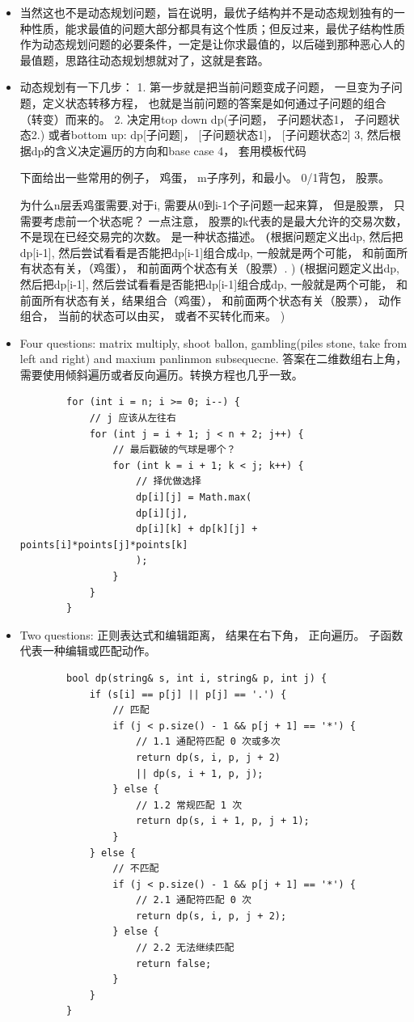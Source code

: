 \documentclass[a4paper,11pt,twoside]{book}
\begin{document}
\begin{itemize}
	
	\item 当然这也不是动态规划问题，旨在说明，最优子结构并不是动态规划独有的一种性质，能求最值的问题大部分都具有这个性质；但反过来，最优子结构性质作为动态规划问题的必要条件，一定是让你求最值的，以后碰到那种恶心人的最值题，思路往动态规划想就对了，这就是套路。
	
	\item 动态规划有一下几步：
	1. 第一步就是把当前问题变成子问题， 一旦变为子问题，定义状态转移方程， 也就是当前问题的答案是如何通过子问题的组合（转变）而来的。  
	2. 决定用top down dp(子问题， 子问题状态1， 子问题状态2.)  或者bottom up: dp[子问题]， [子问题状态1]， [子问题状态2] 
	3, 然后根据dp的含义决定遍历的方向和base case
	4， 套用模板代码
	
	下面给出一些常用的例子， 鸡蛋， m子序列，和最小。 0/1背包， 股票。 
	
	为什么n层丢鸡蛋需要,对于i, 需要从0到i-1个子问题一起来算， 但是股票， 只需要考虑前一个状态呢？ 一点注意， 股票的k代表的是最大允许的交易次数，不是现在已经交易完的次数。 是一种状态描述。 
	\textbf(根据问题定义出dp, 然后把dp[i-1], 然后尝试看看是否能把dp[i-1]组合成dp, 一般就是两个可能， 和前面所有状态有关，（鸡蛋）， 和前面两个状态有关（股票）. ) 
	\textbf(根据问题定义出dp, 然后把dp[i-1], 然后尝试看看是否能把dp[i-1]组合成dp, 一般就是两个可能， 和前面所有状态有关，结果组合（鸡蛋）， 和前面两个状态有关（股票）， 动作组合， 当前的状态可以由买， 或者不买转化而来。  ) 
	
	
	
	\item Four questions: matrix multiply, shoot ballon, gambling(piles stone, take from left and right) and maxium panlinmon subsequecne. 答案在二维数组右上角， 需要使用倾斜遍历或者反向遍历。转换方程也几乎一致。
	
	\begin{lstlisting}
		for (int i = n; i >= 0; i--) {
			// j 应该从左往右
			for (int j = i + 1; j < n + 2; j++) {
				// 最后戳破的气球是哪个？
				for (int k = i + 1; k < j; k++) {
					// 择优做选择
					dp[i][j] = Math.max(
					dp[i][j], 
					dp[i][k] + dp[k][j] + points[i]*points[j]*points[k]
					);
				}
			}
		}
	\end{lstlisting}
	
	\item Two questions: 正则表达式和编辑距离， 结果在右下角， 正向遍历。 子函数代表一种编辑或匹配动作。
	\begin{lstlisting}
		bool dp(string& s, int i, string& p, int j) {
			if (s[i] == p[j] || p[j] == '.') {
				// 匹配
				if (j < p.size() - 1 && p[j + 1] == '*') {
					// 1.1 通配符匹配 0 次或多次
					return dp(s, i, p, j + 2)
					|| dp(s, i + 1, p, j);
				} else {
					// 1.2 常规匹配 1 次
					return dp(s, i + 1, p, j + 1);
				}
			} else {
				// 不匹配
				if (j < p.size() - 1 && p[j + 1] == '*') {
					// 2.1 通配符匹配 0 次
					return dp(s, i, p, j + 2);
				} else {
					// 2.2 无法继续匹配
					return false;
				}
			}
		}
		

\end{lstlisting}
\end{itemize}
\end{document}
